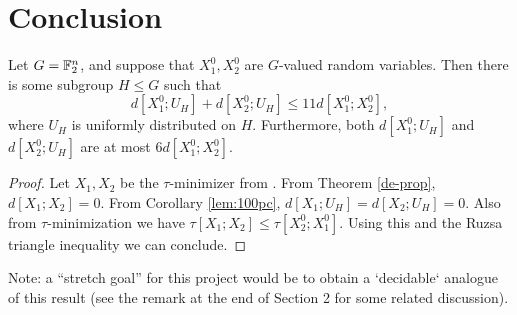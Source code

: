 \section{Conclusion}

\begin{theorem}\label{entropy-pfr}
  \leanok
  Let $G = \mathbb{F}_2^n$, and suppose that $X^0_1, X^0_2$ are $G$-valued random variables.
  Then there is some subgroup $H \leq G$ such that
  \[
    d[X^0_1;U_H] + d[X^0_2;U_H] \le 11 d[X^0_1;X^0_2],
  \]
  where $U_H$ is uniformly distributed on $H$.
  Furthermore, both $d[X^0_1;U_H]$ and $d[X^0_2;U_H]$ are at most $6 d[X^0_1;X^0_2]$.
\end{theorem}

\begin{proof}  \leanok  Let $X_1, X_2$ be the $\tau$-minimizer from .  From Theorem \ref{de-prop}, $d[X_1;X_2]=0$.  From Corollary \ref{lem:100pc}, $d[X_1;U_H] = d[X_2; U_H] = 0$.  Also from $\tau$-minimization we have $\tau[X_1;X_2] \leq \tau[X^0_2;X^0_1]$.  Using this and the Ruzsa triangle inequality we can conclude.
\end{proof}

Note: a ``stretch goal'' for this project would be to obtain a `decidable` analogue of this result (see the remark at the end of Section 2 for some related discussion).
